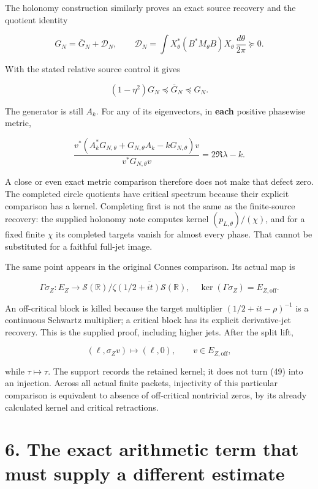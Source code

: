 \documentclass[
  11pt,
]{article}
\begin{document}
The holonomy construction similarly proves an exact source recovery and
the quotient identity

\[
G_N=\overline G_N+\mathscr D_N,\qquad
\mathscr D_N=\int X_\theta^*(B^*M_\theta B)X_\theta\,\frac{d\theta}{2\pi}\succeq0.
\tag{46}
\]

With the stated relative source control it gives

\[
(1-\eta^2)G_N\preceq\overline G_N\preceq G_N.
\tag{47}
\]

The generator is still \(A_k\). For any of its eigenvectors, in
\textbf{each} positive phasewise metric,

\[
\frac{v^*(A_k^*G_{N,\theta}+G_{N,\theta}A_k-kG_{N,\theta})v}
{v^*G_{N,\theta}v}
=2\Re\lambda-k.
\tag{48}
\]

A close or even exact metric comparison therefore does not make that
defect zero. The completed circle quotients have critical spectrum
because their explicit comparison has a kernel. Completing first is not
the same as the finite-source recovery: the supplied holonomy note
computes kernel \((p_{L,\theta})/(\chi)\), and for a fixed finite
\(\chi\) its completed targets vanish for almost every phase. That
cannot be substituted for a faithful full-jet image.

The same point appears in the original Connes comparison. Its actual map
is

\[
\Gamma\sigma_Z:E_Z\longrightarrow
\mathcal S(\mathbb R)/\overline{\zeta(1/2+it)\mathcal S(\mathbb R)},
\quad
\ker(\Gamma\sigma_Z)=E_{Z,\mathrm{off}}.
\tag{49}
\]

An off-critical block is killed because the target multiplier
\((1/2+it-\rho)^{-1}\) is a continuous Schwartz multiplier; a critical
block has its explicit derivative-jet recovery. This is the supplied
proof, including higher jets. After the split lift,

\[
(\ell,\sigma_Zv)\longmapsto(\ell,0),\qquad
v\in E_{Z,\mathrm{off}},
\tag{50}
\]

while \(\tau\mapsto\tau\). The support records the retained kernel; it
does not turn (49) into an injection. Across all actual finite packets,
injectivity of this particular comparison is equivalent to absence of
off-critical nontrivial zeros, by its already calculated kernel and
critical retractions.

\section{6. The exact arithmetic term that must supply a different
estimate}\label{the-exact-arithmetic-term-that-must-supply-a-different-estimate}
\end{document}

